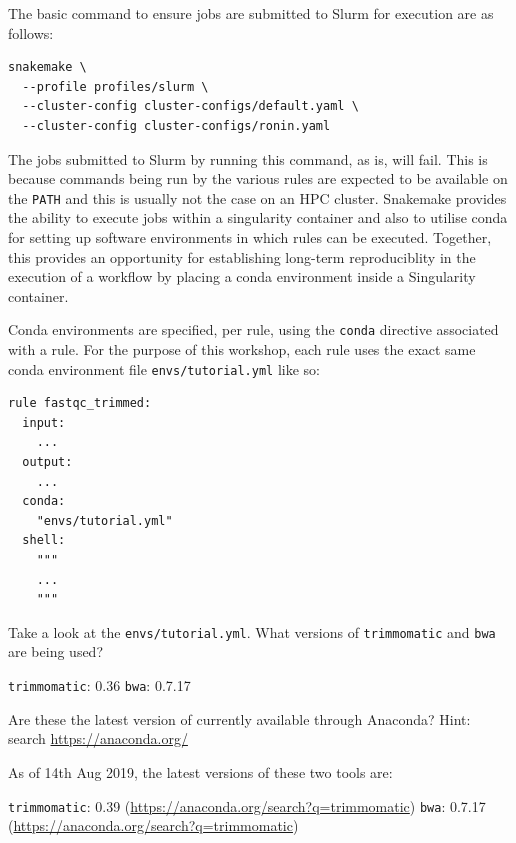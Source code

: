 The basic command to ensure jobs are submitted to Slurm for execution are as follows:

\begin{lstlisting}
snakemake \
  --profile profiles/slurm \
  --cluster-config cluster-configs/default.yaml \
  --cluster-config cluster-configs/ronin.yaml
\end{lstlisting}

The jobs submitted to Slurm by running this command, as is, will fail. This is because commands being run by the various rules are expected to be available on the \texttt{PATH}
and this is usually not the case on an HPC cluster. Snakemake provides the ability to execute jobs within a singularity container and also to utilise conda for setting 
up software environments in which rules can be executed. Together, this provides an opportunity for establishing long-term reproduciblity in the execution of a workflow by placing
a conda environment inside a Singularity container.

Conda environments are specified, per rule, using the \texttt{conda} directive associated with a rule. For the purpose of this workshop, each rule uses the exact same conda
environment file \texttt{envs/tutorial.yml} like so:

\begin{lstlisting}
rule fastqc_trimmed:
  input:
    ...
  output:
    ...
  conda:
    "envs/tutorial.yml"
  shell:
    """
    ...
    """
\end{lstlisting}

\begin{questions}

Take a look at the \texttt{envs/tutorial.yml}. What versions of \texttt{trimmomatic} and \texttt{bwa} are being used?

\begin{answer}
\texttt{trimmomatic}: 0.36
\texttt{bwa}: 0.7.17
\end{answer}

Are these the latest version of currently available through Anaconda? Hint: search \url{https://anaconda.org/}

\begin{answer}
As of 14th Aug 2019, the latest versions of these two tools are:

\texttt{trimmomatic}: 0.39 (\url{https://anaconda.org/search?q=trimmomatic})
\texttt{bwa}: 0.7.17 (\url{https://anaconda.org/search?q=trimmomatic})
\end{answer}

\end{questions}

